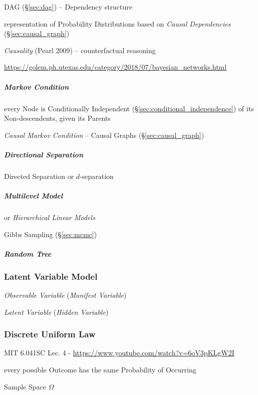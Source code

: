 DAG (\S\ref{sec:dag}) -- Dependency structure

representation of Probability Distributions based on \emph{Causal Dependencies}
(\S\ref{sec:causal_graph})

\emph{Causality} (Pearl 2009) -- counterfactual reasoning

\url{https://golem.ph.utexas.edu/category/2018/07/bayesian_networks.html}



\subparagraph{Markov Condition}\label{sec:markov_condition}\hfill

every Node is Conditionally Independent (\S\ref{sec:conditional_independence})
of its Non-descendents, given its Parents

\emph{Causal Markov Condition}
--
Causal Graphs (\S\ref{sec:causal_graph})



\subparagraph{Directional Separation}\label{sec:directional_separation}\hfill

Directed Separation or $d$-separation



\subparagraph{Multilevel Model}\label{sec:multilevel_model}\hfill

or \emph{Hierarchical Linear Models}

Gibbs Sampling (\S\ref{sec:mcmc})



\subparagraph{Random Tree}\label{sec:random_tree}\hfill



\subsubsection{Latent Variable Model}\label{sec:latent_variable_model}

\emph{Observable Variable} (\emph{Manifest Variable})

\emph{Latent Variable} (\emph{Hidden Variable})



\subsubsection{Discrete Uniform Law}\label{sec:discrete_uniform_law}

MIT 6.041SC Lec. 4 - \url{https://www.youtube.com/watch?v=6oV3pKLgW2I}

every possible Outcome has the same Probability of Occurring

Sample Space $\Omega$

